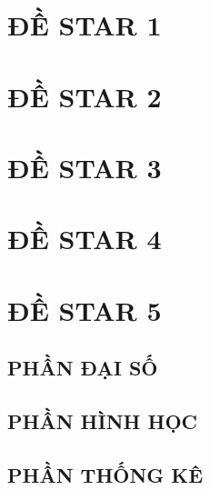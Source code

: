       \section{ĐỀ STAR 1}
        
      \section{ĐỀ STAR 2}
        
      \section{ĐỀ STAR 3}
        
      \section{ĐỀ STAR 4}
        
     \section{ĐỀ STAR 5}
        
      
        
        \subsection{PHẦN ĐẠI SỐ}
        
       \subsection{PHẦN HÌNH HỌC}
        
       \subsection{PHẦN THỐNG KÊ}
        
